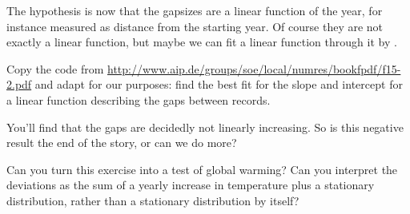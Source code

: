 The hypothesis is now that the gapsizes are a linear function of the
year, for instance measured as distance from the starting year. Of
course they are not exactly a linear function, but maybe we can fit a
linear function through it by .

\begin{exercise}
  Copy the code from
  \url{http://www.aip.de/groups/soe/local/numres/bookfpdf/f15-2.pdf} and
  adapt for our purposes: find the best fit for the slope and
  intercept for a linear function describing the gaps between records.
\end{exercise}

You'll find that the gaps are decidedly not linearly increasing.
So is this negative result the end of the story, or can we do more?

\begin{exercise}
  Can you turn this exercise into a test of global warming? Can you
  interpret the deviations as the sum of a yearly increase in temperature
  plus a stationary distribution, rather than a stationary
  distribution by itself?
\end{exercise}
